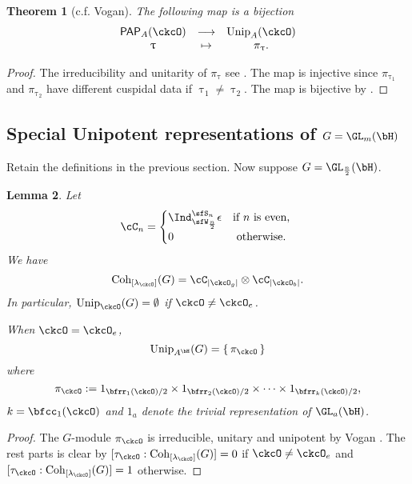 \documentclass[12pt,a4paper]{amsart}
\def\abs#1{\left|{#1}\right|}
\numberwithin{equation}{section}
\newtheorem{thm}{Theorem}[section]
\newtheorem{lem}[thm]{Lemma}
\theoremstyle{remark}
\def\Unip{\mathrm{Unip}}
\def\lamck{\lambda_\ckcO}
\def\Cint#1{\Coh_{[#1]}}
\def\PP{\mathsf{PAP}}
\def\Coh{\mathrm{Coh}}
\begin{document}
\begin{thm}[c.f. Vogan]
  The following map is a bijection
  \[
    \begin{array}{ccc}
      \PP_{A}(\ckcO) & \longrightarrow & \Unip_{A}(\ckcO)\\
      \uptau & \mapsto & \pi_{\uptau}.
    \end{array}
  \]
\end{thm}
\begin{proof}
  The irreducibility and unitarity of $\pi_{\uptau}$ see \cite{V.GL}.
  The map is injective since $\pi_{\uptau_{1}}$ and $\pi_{\uptau_{2}}$ have different
  cuspidal data if  $\uptau_{1}\neq \uptau_{2}$.
  The map is bijective by .
\end{proof}

\subsection{Special Unipotent representations of $G=\GL_{m}(\bH)$}

Retain the definitions in the previous section. Now suppose $G = \GL_{\frac{n}{2}}(\bH)$.

\begin{lem}
  Let
  \[
  \cC_{n} = \begin{cases}
    \Ind_{\sfW_{\frac{n}{2}}}^{\sfS_{n}}\epsilon
    & \text{if $n$ is even, }  \\
      0 & \text{ otherwise. } \\
    \end{cases}
  \]
  We have
  \[
    \Cint{\lamck}(G)  =
    \cC_{\abs{\ckcO_{g}}}\otimes \cC_{\abs{\ckcO_{b}}}.
  \]
  In particular, $\Unip_\ckcO(G) = \emptyset$ if $\ckcO \neq \ckcO_e$.

  When $\ckcO = \ckcO_{e}$,
  \[
    \Unip_{A^{\bH}}(G) = \set{\pi_{\ckcO}}
  \]
  where
  \[
    \pi_{\ckcO} := 1_{\bfrr_1(\ckcO)/2}\times 1_{\bfrr_2(\ckcO)/2} \times \cdots
   \times  1_{\bfrr_k(\ckcO)/2},
  \]
  $k = \bfcc_{1}(\ckcO)$
  and $1_{a}$ denote the trivial representation of $\GL_{a}(\bH)$.

\end{lem}
\begin{proof}
  The $G$-module $\pi_{\ckcO}$ is irreducible, unitary and unipotent by Vogan
  \cite{V.GL}.
  The rest parts is clear by $[\tau_{\ckcO}:\Cint{\lamck}(G)] = 0$ if
  $\ckcO \neq \ckcO_{e}$
  and $[\tau_{\ckcO}:\Cint{\lamck}(G)] = 1$ otherwise.
\end{proof}
\end{document}
